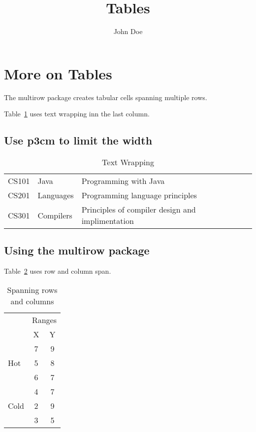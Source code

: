 \documentclass{article}
\title{Tables}
\author{John Doe}
\date{}
\begin{document}
\maketitle
\section{More on Tables}

The multirow package creates tabular cells spanning multiple rows.

Table~\ref{tab:wrapping} uses text wrapping inn the last column.

\subsection{Use p{3cm} to limit the width}

\begin{table}[ht]
	\caption{Text Wrapping} 
	\begin{center}
		\begin{tabular}{| l | l | p{3cm}|}
			\hline
			CS101 & Java      & Programming with Java                            \\
			CS201 & Languages & Programming language principles                  \\
			CS301 & Compilers & Principles of compiler design and implimentation \\
			\hline
		\end{tabular}
	\end{center}
	\label{tab:wrapping}
\end{table}

\subsection{Using the multirow package}

Table~\ref{tab:multi} uses row and column span.

\begin{table}[ht]
	\caption{Spanning rows and columns}
	\begin{center}
		\begin{tabular}{| l | c | c|}
			\hline
			& \multicolumn{2}{c|}{Ranges} \\
			                      & X & Y \\
			\hline
			\multirow{3}{*}{Hot}  & 7 & 9 \\
			                      & 5 & 8 \\
			                      & 6 & 7 \\
			\hline
			\multirow{3}{*}{Cold} & 4 & 7 \\
			                      & 2 & 9 \\
			                      & 3 & 5 \\
			\hline
		\end{tabular}
	\end{center}
	\label{tab:multi}
\end{table}
\end{document}
